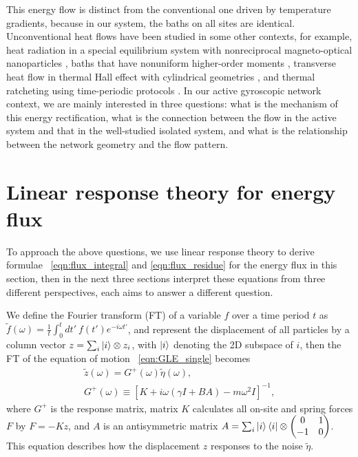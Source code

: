 \documentclass[
 preprint,
 preprintnumbers,
 amsmath,amssymb,
 aps,
 pre,
 longbibliography,
 10pt, twocolumn
]{revtex4-1}
\begin{document}
This energy flow is distinct from the conventional one driven by temperature gradients, because in our system, the baths on all sites are identical. 
Unconventional heat flows have been studied in some other contexts, for example, heat radiation in a special equilibrium system with nonreciprocal magneto-optical nanoparticles \cite{Zhu2016PersistentTransfer}, baths that have nonuniform higher-order moments \cite{Kanazawa2013HeatFluctuations}, transverse heat flow in thermal Hall effect with cylindrical geometries \cite{Nomura2012Cross-correlatedSuperfluids,Zhang2016BerryEffects}, and thermal ratcheting using time-periodic protocols \cite{Li2008RatchetingBias,Ren2010EmergenceBias,Ren2012GeometricSystems}.
In our active gyroscopic network context, we are mainly interested in three questions: what is the mechanism of this energy rectification, what is the connection between the flow in the active system and that in the well-studied isolated system, and what is the relationship between the network geometry and the flow pattern.


\section{Linear response theory for energy flux} \label{sec:linear_response}
To approach the above questions, we use linear response theory to derive formulae \eqnname~\eqref{eqn:flux_integral} and \eqref{eqn:flux_residue} for the energy flux in this section, then in the next three sections interpret these equations from three different perspectives, each aims to answer a different question.

We define the Fourier transform (FT) of a variable $f$ over a time period $t$ as $\tilde{f}(\omega) = \frac{1}{t} \int_0^t dt'\ f(t')e^{-i\omega t'}$, and represent the displacement of all particles by a column vector $z=\sum_i \ket{i}\otimes z_i$, with $\ket{i}$ denoting the 2D subspace of $i$,
then the FT of the equation of motion \eqnname~\eqref{eqn:GLE_single} becomes
\begin{gather} \label{eqn:response}
    \tilde{z}(\omega) = G^+(\omega) \tilde{\eta}(\omega), \\
    G^{+}(\omega) \equiv [K + i\omega(\gamma I + BA) - m\omega^2I]^{-1},
\end{gather}
where $G^+$ is the response matrix, matrix $K$ calculates all on-site and spring forces $F$ by $F=-Kz$, and $A$ is an antisymmetric matrix $A=\sum_i \ket{i}\bra{i}\otimes \mqty(0 & 1 \\ -1 & 0)$.
This equation describes how the displacement $z$ responses to the noise $\tilde{\eta}$.
\end{document}
